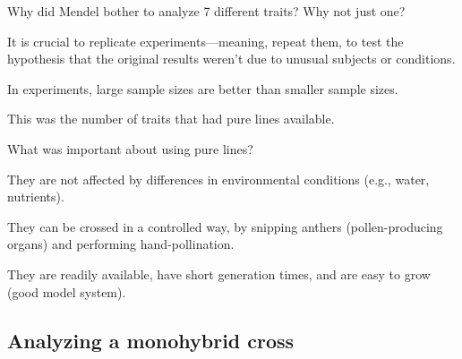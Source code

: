 \begin{frame}
    \begin{clickerquestion}
        \item Why did Mendel bother to analyze 7 different traits? Why not just
            one?
        \begin{clickeroptions}
            \item It is crucial to replicate experiments---meaning, repeat them,
                to test the hypothesis that the original results weren't due to
                unusual subjects or conditions.
            \item In experiments, large sample sizes are better than smaller
                sample sizes.
            \item This was the number of traits that had pure lines available.
            \item {}
        \end{clickeroptions}
    \end{clickerquestion}
\end{frame}

\begin{frame}
    \begin{clickerquestion}
        \item What was important about using pure lines?
        \begin{clickeroptions}
            \item {}
            \item They are not affected by differences in environmental
                conditions (e.g., water, nutrients).
            \item They can be crossed in a controlled way, by snipping anthers
                (pollen-producing organs) and performing hand-pollination.
            \item They are readily available, have short generation times, and
                are easy to grow (good model system).
        \end{clickeroptions}
    \end{clickerquestion}
\end{frame}

\subsection{Analyzing a monohybrid cross}

